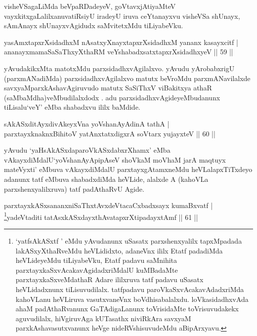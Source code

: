 \begin{artha}
visheVSagaLiMda beVpaRDadeyeV, goVtavxjAtiyaMteV vayxkitxgaLalilx\break anuvatiRsiyU iradeyU iruva ceYtanayxvu visheVSa shUnayx, sAmAnayx shUnayxvAgidudx saMvitetxMdu tiLiyabeVku.
\end{artha}


\begin{shl}
yasAmxtapxrXsidadhxM nAsatxyXnayxtapxrXsidadhxM yananx kasayxcitf |\\
ananayxmamaSaSaThxyXthaRM veYshabadxsatxtapxrXsidadhxyeV \hfill || 59 ||
\end{shl}

\begin{artha}
yAvudakikxMta matotxMdu parxsidadhxvAgilalxvo. yAvudu yArobabxrigU  (parxmANadiMda) parxsidadhxvAgilalxvo matutx beVroMdu parxmANavilalxde savxyaMparxkAshavAgiruvudo matutx SaSiThxV viBakitxya athaR (saMbaMdha)veMbudilalxdodx . adu parxsidadhxvAgideyeMbudanunx tiLisalu`veY' eMba shabadxvu ililx baMdide.
\end{artha}


\begin{shl}
sAkASxditAyxdivAkeyxVna yoV\s shanAyAdinA tathA |\\
parxtayxknaknxBihitoV yatAnxtatxdigxrA soV\s tarx yujayxteV \hfill || 60 ||
\end{shl}

\begin{artha}
yAvudu `yaHsAkASxdaparoVkASxdabxrXhamx' eMba vAkayxdiMdalU\break `yoV\s shanAyApipAseV shoVkaM moVhaM jarA maqtuyx mateVyxti' eMbuva vAkayxdiMdalU parxtayxgAtamxneMdu heVLalapxTiTxdeyo adanunx tatf eMbuva shabadxdiMda heVLide, alalxde A (kahoVLa parxshenxyalilxruva) tatf padAthaRvU Agide.
\end{artha}


\begin{shl}
parxtayxkASxsananxniSaThxtAvxdeVtacaCxbadxsayx kumaBxvatf |\\
\footnote{`yatfsAkASxtf ' eMdu yAvudanunx uSasatx parxshenxyalilx tapxMpadada lakASxyXthaRveMdu heVLididxto, adaneVnx ililx Etatf padadiMda heVLideyeMdu tiLiyabeVku, Etatf padavu saMnihita parxtayxkaSxvAcakavAgidadxriMdalU kuMBadaMte parxtayxkaSxveMdathaR Adare ililxruva tatf padavu uSasatx heVLidadxnunx tiLisuvudilalx. tatfpadavu paroVkaSxvAcakavAdadxriMda kahoVLanu heVLiruva vasutxvaneVnx boVdhisabalalxdu. loVkasidadhxvAda ahaM padAthaRvanunx GaTAdigaLanunx toVrisidaMte toVrisuvudakekx aguvudilalx, hiVgiruvAga kUTasathx niviRkAra savxyaM parxkAshavasutxvanunx heVge nideRVshisuvudeMdu aBipArxyavu.}yadeVtaditi tatAsxkASxdayxthAvatapxrXtipadayxtAmf \hfill || 61 ||
\end{shl}

